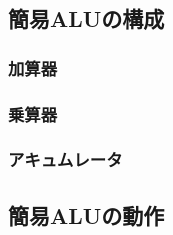     \subsection{簡易ALUの構成}
        \subsubsection{加算器}

        \subsubsection{乗算器}

        \subsubsection{アキュムレータ}

    \subsection{簡易ALUの動作}
